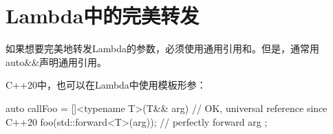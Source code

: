 \section{Lambda中的完美转发}
如果想要完美地转发Lambda的参数，必须使用通用引用和。但是，通常用auto\&\&声明通用引用。

C++20中，也可以在Lambda中使用模板形参：

\begin{cppcode}
auto callFoo = []<typename T>(T&& arg) { // OK, universal reference since C++20
	foo(std::forward<T>(arg)); // perfectly forward arg
};
\end{cppcode}

